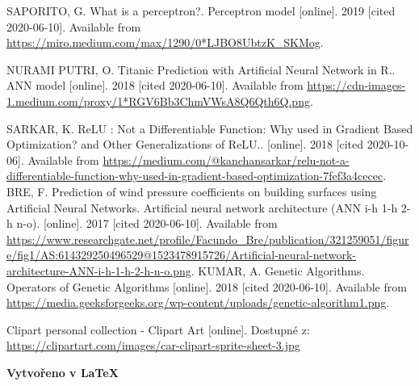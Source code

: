\documentclass[a4paper,12pt]{article}
\begin{document}
    \bigskip
    \tableofcontents
    \listoffigures

    \begin{thebibliography}{6}
            SAPORITO, G. What is a perceptron?. Perceptron model [online]. 2019 [cited 2020-06-10]. 
            Available from \url{https://miro.medium.com/max/1290/0*LJBO8UbtzK_SKMog}.

            NURAMI PUTRI, O. Titanic Prediction with Artificial Neural Network in R.. ANN model 
            [online]. 2018 [cited 2020-06-10]. Available from \url{https://cdn-images-1.medium.com/proxy/1*RGV6Bb3ChmVWsA8Q6Qth6Q.png}.

            SARKAR, K. ReLU : Not a Differentiable Function: 
            Why used in Gradient Based Optimization? and Other Generalizations of ReLU.. [online]. 
            2018 [cited 2020-10-06]. Available from \url{https://medium.com/@kanchansarkar/relu-not-a-differentiable-function-why-used-in-gradient-based-optimization-7fef3a4cecec}.
            BRE, F. Prediction of wind pressure coefficients on building surfaces using 
            Artificial Neural Networks. Artificial neural network architecture (ANN i-h 1-h 2-h n-o). 
            [online]. 2017 [cited 2020-06-10]. Available from \url{https://www.researchgate.net/profile/Facundo_Bre/publication/321259051/figure/fig1/AS:614329250496529@1523478915726/Artificial-neural-network-architecture-ANN-i-h-1-h-2-h-n-o.png}.
            KUMAR, A. Genetic Algorithms. Operators of Genetic Algorithms [online]. 2018 
            [cited 2020-06-10]. Available from \url{https://media.geeksforgeeks.org/wp-content/uploads/genetic-algorithm1.png}.

            Clipart personal collection - Clipart Art [online]. 
            Dostupné z: \url{https://clipartart.com/images/car-clipart-sprite-sheet-3.jpg}
    \end{thebibliography}

    \vspace{2em}
    \begin{center}
        \footnotesize{
            \textbf{Vytvořeno v \LaTeX}
        }
    \end{center}
\end{document}
